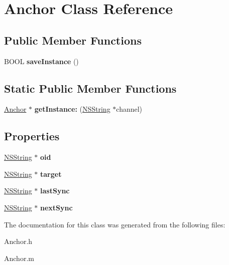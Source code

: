 \hypertarget{interface_anchor}{
\section{\-Anchor \-Class \-Reference}
\label{interface_anchor}
}
\subsection*{\-Public \-Member \-Functions}
\begin{DoxyCompactItemize}
\item 
\hypertarget{interface_anchor_ad2bf14b4497dfe40d32b39bbb703b4ba}{
\-B\-O\-O\-L {\bfseries save\-Instance} ()}
\label{interface_anchor_ad2bf14b4497dfe40d32b39bbb703b4ba}

\end{DoxyCompactItemize}
\subsection*{\-Static \-Public \-Member \-Functions}
\begin{DoxyCompactItemize}
\item 
\hypertarget{interface_anchor_acb4b964f52492842c7c2eccbeccbe97d}{
\hyperlink{interface_anchor}{\-Anchor} $\ast$ {\bfseries get\-Instance\-:} (\hyperlink{class_n_s_string}{\-N\-S\-String} $\ast$channel)}
\label{interface_anchor_acb4b964f52492842c7c2eccbeccbe97d}

\end{DoxyCompactItemize}
\subsection*{\-Properties}
\begin{DoxyCompactItemize}
\item 
\hypertarget{interface_anchor_a0a09df47300a690cff7d8b1df88fd524}{
\hyperlink{class_n_s_string}{\-N\-S\-String} $\ast$ {\bfseries oid}}
\label{interface_anchor_a0a09df47300a690cff7d8b1df88fd524}

\item 
\hypertarget{interface_anchor_a67abb3f4400fc8ea6748865a40576336}{
\hyperlink{class_n_s_string}{\-N\-S\-String} $\ast$ {\bfseries target}}
\label{interface_anchor_a67abb3f4400fc8ea6748865a40576336}

\item 
\hypertarget{interface_anchor_a00a078ac73a370cf682b07cd08a8cea6}{
\hyperlink{class_n_s_string}{\-N\-S\-String} $\ast$ {\bfseries last\-Sync}}
\label{interface_anchor_a00a078ac73a370cf682b07cd08a8cea6}

\item 
\hypertarget{interface_anchor_ae6ce31caccba0d8974f14e5bea2525fa}{
\hyperlink{class_n_s_string}{\-N\-S\-String} $\ast$ {\bfseries next\-Sync}}
\label{interface_anchor_ae6ce31caccba0d8974f14e5bea2525fa}

\end{DoxyCompactItemize}


\-The documentation for this class was generated from the following files\-:\begin{DoxyCompactItemize}
\item 
\-Anchor.\-h\item 
\-Anchor.\-m\end{DoxyCompactItemize}
